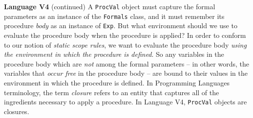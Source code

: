 \begin{minipage}[t]{\sw}
\slidenumber
\LARGE
{\bf Language V4} (continued)\exx
A \verb'ProcVal' object must capture
the formal parameters as an instance of the \verb'Formals' class,
and it must remember its procedure {\em body}
as an instance of \verb'Exp'.
But what environment should we use to evaluate the procedure body
when the procedure is applied?
In order to conform to our notion of {\em static scope rules},
we want to evaluate the procedure body
{\em using the environment in which the procedure is defined}.
So any variables in the procedure body
which are {\em not} among the formal parameters --
in other words, the variables that {\em occur free} in the procedure body --
are bound to their values in the environment
in which the procedure is defined.\exx
In Programming Languages terminology, the term {\em closure}
refers to an entity that captures all of the ingredients necessary
to apply a procedure.
In Language V4,
\verb'ProcVal' objects are closures.
\end{minipage}
\clearpage
